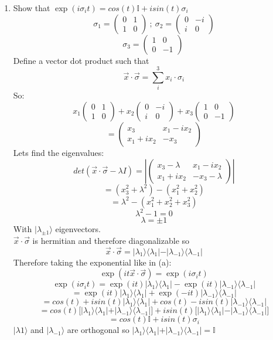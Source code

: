 \documentclass[12pt]{article}
\newcommand{\ket}[1]{\vert{#1}\rangle}
\newcommand{\bra}[1]{\langle{#1}\vert}
\begin{document}
\begin{enumerate}
\begin{enumerate}
    \item Show that $\exp(i\sigma_i t) = cos(t)\mathbb{I} + isin(t)\sigma_i  $
    $$
    \sigma_1 = \left( \begin{array}{cc} 0 & 1 \\ 1 & 0 \end{array} \right)  \ ; \ \sigma_2 = \left( \begin{array}{cc} 0 & -i \\ i & 0 \end{array} \right) 
    $$
    $$
    \sigma_3 = \left( \begin{array}{cc} 1 & 0 \\ 0 & -1 \end{array} \right)  \ 
    $$
    Define a vector dot product such that 
    $$ \vec{x} \cdot \vec{\sigma} = \sum_i^3 x_i \cdot \sigma_i$$
    So:
    $$ x_1 \left( \begin{array}{cc} 0 & 1 \\ 1 & 0 \end{array} \right)  + x_2 \left( \begin{array}{cc} 0 & -i \\ i & 0 \end{array} \right) + x_3 \left( \begin{array}{cc} 1 & 0 \\ 0 & -1 \end{array} \right)$$
    $$ = \left( \begin{array}{cc} x_3 & x_1-ix_2 \\ x_1+ix_2 & -x_3 \end{array} \right) $$
    Lets find the eigenvalues: 
    $$ det(\vec{x} \cdot \vec{\sigma} - \lambda I) = |\left( \begin{array}{cc} x_3-\lambda & x_1 -ix_2 \\ x_1 +i x_2 & -x_3 -\lambda \end{array} \right)| $$
    $$ = (x_3^2 +\lambda^2) - (x_1^2 +x_2^2) $$
    $$ = \lambda^2 - (x_1^2 +x_2^2 +x_3^2) $$
    $$ \lambda^2 -1 =0 $$ 
    $$ \lambda = \pm 1 $$
    With $ \ket{\lambda_{\pm{1}}} $ eigenvectors. 
    \\ 
    $\vec{x} \cdot \vec{\sigma} $ is hermitian and therefore diagonalizable so 
    $$ \vec{x} \cdot \vec{\sigma} = \ket{\lambda_1}\bra{\lambda_1} - \ket{\lambda_{-1}}\bra{\lambda_{-1}} $$
    Therefore taking the exponential like in (a): 
    $$ \exp(it\vec{x}\cdot\vec{\sigma}) = \exp(i\sigma_i t) $$
    $$ \exp(i\sigma_i t) = \exp(it) \ket{\lambda_1}\bra{\lambda_1} - \exp(it) \ket{\lambda_{-1}}\bra{\lambda_{-1}} $$
    $$ = \exp(it) \ket{\lambda_1}\bra{\lambda_1} + \exp(-it) \ket{\lambda_{-1}}\bra{\lambda_{-1}} $$
    $$ = cos(t) + isin(t) \ket{\lambda_1}\bra{\lambda_1} + cos(t) -isin(t) \ket{\lambda_{-1}}\bra{\lambda_{-1}} $$
    $$ =cos(t)\Big[\ket{\lambda_1}\bra{\lambda_1} + \ket{\lambda_{-1}}\bra{\lambda_{-1}}\Big] + isin(t)\Big[\ket{\lambda_1}\bra{\lambda_1} - \ket{\lambda_{-1}}\bra{\lambda_{-1}} \Big] $$ 
    $$ = cos(t)\mathbb{I} + isin(t)\sigma_i $$
    $\ket{\lambda1}$ and $\ket{\lambda_{-1}}$ are orthogonal so $\ket{\lambda_1}\bra{\lambda_1} + \ket{\lambda_{-1}}\bra{\lambda_{-1}} = \mathbb{I} $


\end{enumerate}
\end{enumerate}
\end{document}
